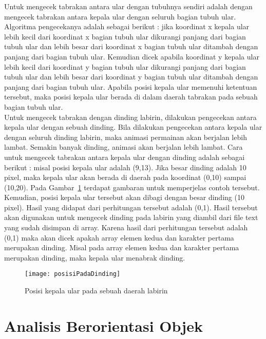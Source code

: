 Untuk mengecek tabrakan antara ular dengan tubuhnya sendiri adalah dengan mengecek tabrakan antara kepala ular dengan seluruh bagian tubuh ular. Algoritma pengecekanya adalah sebagai berikut : jika koordinat x kepala ular lebih kecil dari koordinat x bagian tubuh ular dikurangi panjang dari bagian tubuh ular dan lebih besar dari koordinat x bagian tubuh ular ditambah dengan panjang dari bagian tubuh ular. Kemudian dicek apabila koordinat y kepala ular lebih kecil dari koordinat y bagian tubuh ular dikurangi panjang dari bagian tubuh ular dan lebih besar dari koordinat y bagian tubuh ular ditambah dengan panjang dari bagian tubuh ular. Apabila posisi kepala ular memenuhi ketentuan tersebut, maka posisi kepala ular berada di dalam daerah tabrakan pada sebuah bagian tubuh ular.\\

Untuk mengecek tabrakan dengan dinding labirin, dilakukan pengecekan antara kepala ular dengan sebuah dinding. Bila dilakukan pengecekan antara kepala ular dengan seluruh dinding labirin, maka animasi permainan akan berjalan lebih lambat. Semakin banyak dinding, animasi akan berjalan lebih lambat. Cara untuk mengecek tabrakan antara kepala ular dengan dinding adalah sebagai berikut : misal posisi kepala ular adalah (9,13). Jika besar dinding adalah 10 pixel, maka kepala ular akan berada di daerah pada koordinat (0,10) sampai (10,20). Pada Gambar~\ref{fig:posisiPadaDinding} terdapat gambaran untuk memperjelas contoh tersebut. Kemudian, posisi kepala ular tersebut akan dibagi dengan besar dinding (10 pixel). Hasil yang didapat dari perhitungan tersebut adalah (0,1). Hasil tersebut akan digunakan untuk mengecek dinding pada labirin yang diambil dari file text yang sudah disimpan di array. Karena hasil dari perhitungan tersebut adalah (0,1) maka akan dicek apakah array elemen kedua dan karakter pertama merupakan dinding. Misal pada array elemen kedua dan karakter pertama merupakan dinding, maka kepala ular menabrak dinding.

\begin{figure}[H]
	\centering  
	\texttt{[image: posisiPadaDinding]}  
	\caption[Posisi kepala ular pada sebuah daerah labirin]{Posisi kepala ular pada sebuah daerah labirin}
	\label{fig:posisiPadaDinding} 
\end{figure}

\section{Analisis Berorientasi Objek}

